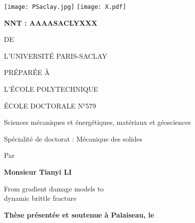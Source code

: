 
\begin{titlepage}

\begin{flushleft}
\texttt{[image: PSaclay.jpg]} \hfill
\texttt{[image: X.pdf]}
\end{flushleft}
\vspace{10pt}

\begin{framed}
\begin{flushleft}
\large\textbf{NNT : AAAASACLYXXX}
\end{flushleft}
\vspace{20pt}

\begin{center}
{\color{color02}{\LARGE THÈSE DE DOCTORAT}

\vspace{8pt}
{\LARGE DE}

\vspace{8pt}
{\LARGE L'UNIVERSITÉ PARIS-SACLAY}

\vspace{8pt}
{\LARGE PRÉPARÉE À}

\vspace{8pt}
{\LARGE L'ÉCOLE POLYTECHNIQUE}}

\vspace{24pt}
{\Large ÉCOLE DOCTORALE N°579}

\vspace{5pt}
{\Large Sciences mécaniques et énergétiques, matériaux et géosciences}

\vspace{16pt}
{\Large Spécialité de doctorat : Mécanique des solides}
\vspace{12pt}

{\large Par}
\vspace{12pt}

{\Large\bfseries Monsieur Tianyi LI}
\vspace{20pt}

{\Large
From gradient damage models to \\
dynamic brittle fracture}
\end{center}

\vfill
\begin{flushleft}
\large
\textbf{Thèse présentée et soutenue à Palaiseau, le}
\vspace{15pt}


\end{flushleft}
\end{framed}
\end{titlepage}
